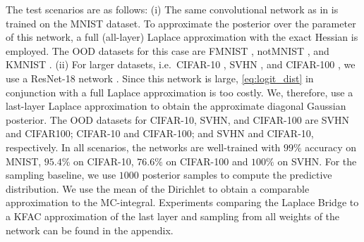 The test scenarios are as follows: (i) The same convolutional network as in  is trained on the MNIST dataset. To approximate the posterior over the parameter of this network, a full (all-layer) Laplace approximation with the exact Hessian is employed. The OOD datasets for this case are FMNIST \cite{FMNIST2017}, notMNIST \cite{notMNIST2011}, and KMNIST \cite{KMNIST2018}. (ii) For larger datasets, i.e.~CIFAR-10 \cite{CIFAR2009}, SVHN \cite{SVHN2011}, and CIFAR-100 \cite{CIFAR2009}, we use a ResNet-18 network \citep{2015_ResNet}. Since this network is large, \eqref{eq:logit_dist} in conjunction with a full Laplace approximation is too costly. We, therefore, use a last-layer Laplace approximation to obtain the approximate diagonal Gaussian posterior. The OOD datasets for CIFAR-10, SVHN, and CIFAR-100 are SVHN and CIFAR100; CIFAR-10 and CIFAR-100; and SVHN and CIFAR-10, respectively. In all scenarios, the networks are well-trained with $99\%$ accuracy on MNIST, $95.4\%$ on CIFAR-10, $76.6\%$ on CIFAR-100 and $100\%$ on SVHN. For the sampling baseline, we use $1000$ posterior samples to compute the predictive distribution. We use the mean of the Dirichlet to obtain a comparable approximation to the MC-integral. Experiments comparing the Laplace Bridge to a KFAC approximation of the last layer and sampling from all weights of the network can be found in the appendix.

